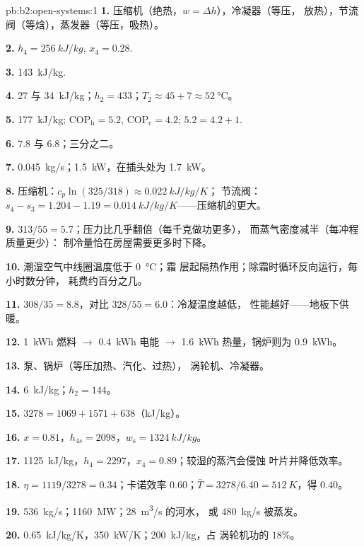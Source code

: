 \begin{solution}{pb:b2:open-systems:1}
\textbf{1.} 压缩机（绝热，$w = \Delta h$），冷凝器（等压，
放热），节流阀（等焓），蒸发器（等压，吸热）。

\textbf{2.} $h_4 = \qty{256}{kJ/kg}$, $x_4 = 0.28$.

\textbf{3.} \qty{143}{kJ/kg}.

\textbf{4.} \qty{27}{} 与 \qty{34}{kJ/kg}；$h_2 = 433$；$T_2 \approx 45 + 7 \approx
\qty{52}{\celsius}$。

\textbf{5.} \qty{177}{kJ/kg}; $\mathrm{COP}_{\text{h}} = 5.2$, $\mathrm{COP}_{\text{c}} = 4.2$;
$5.2 = 4.2 + 1$.

\textbf{6.} $7.8$ 与 $6.8$；三分之二。

\textbf{7.} \qty{0.045}{kg/s}；\qty{1.5}{kW}，在插头处为 \qty{1.7}{kW}。

\textbf{8.} 压缩机：$c_p\ln(325/318) \approx \qty{0.022}{kJ/kg/K}$；
节流阀：$s_4 - s_3 = 1.204 - 1.19 = \qty{0.014}{kJ/kg/K}$——压缩机的更大。

\textbf{9.} $313/55 = 5.7$；压力比几乎翻倍（每千克做功更多），
而蒸气密度减半（每冲程质量更少）：
制冷量恰在房屋需要更多时下降。

\textbf{10.} 潮湿空气中线圈温度低于 \qty{0}{\celsius}；霜
层起隔热作用；除霜时循环反向运行，每小时数分钟，
耗费约百分之几。

\textbf{11.} $308/35 = 8.8$，对比 $328/55 = 6.0$：冷凝温度越低，
性能越好——地板下供暖。

\textbf{12.} \qty{1}{kWh} 燃料 $\to$ \qty{0.4}{kWh} 电能 $\to$
\qty{1.6}{kWh} 热量，锅炉则为 \qty{0.9}{kWh}。

\textbf{13.} 泵、锅炉（等压加热、汽化、过热），
涡轮机、冷凝器。

\textbf{14.} \qty{6}{kJ/kg}；$h_2 = 144$。

\textbf{15.} $3278 = 1069 + 1571 + 638$（\unit{kJ/kg}）。

\textbf{16.} $x = 0.81$，$h_{4s} = 2098$，$w_{\text{s}} = \qty{1324}{kJ/kg}$。

\textbf{17.} \qty{1125}{kJ/kg}，$h_4 = 2297$，$x_4 = 0.89$；较湿的蒸汽会侵蚀
叶片并降低效率。

\textbf{18.} $\eta = 1119/3278 = 0.34$；卡诺效率 $0.60$；$\bar T = 3278/6.40 =
\qty{512}{K}$，得 $0.40$。

\textbf{19.} \qty{536}{kg/s}；\qty{1160}{MW}；\qty{28}{m^3/s} 的河水，
或 \qty{480}{kg/s} 被蒸发。

\textbf{20.} \qty{0.65}{kJ/kg/K}，\qty{350}{kW/K}；\qty{200}{kJ/kg}，占
涡轮机功的 $18\%$。


\end{solution}
